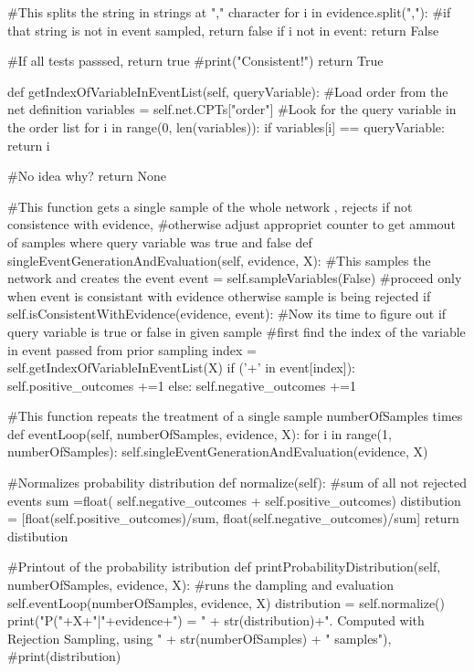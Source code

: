 \documentclass[10pt]{article}
\begin{document}
\begin{spverbatim}
        #This splits the string in strings at "," character
        for i in evidence.split(","):
            #if that string is not in event sampled, return false
            if i not in event:
                return False
                
        #If all tests passsed, return true
	#print("Consistent!")
        return True
    
    def getIndexOfVariableInEventList(self,  queryVariable):
        #Load order from the net definition
        variables = self.net.CPTs["order"]
        #Look for the query variable in the order list
        for i in range(0,  len(variables)):
            if variables[i] == queryVariable:
                return i 
        
        #No idea why?
        return None
                
    
    #This function gets a single sample of the whole network , rejects if not consistence with evidence, 
    #otherwise adjust appropriet counter to get ammout of samples where query variable was true and false
    def singleEventGenerationAndEvaluation(self, evidence,  X):
        #This samples the network  and creates the event
        event = self.sampleVariables(False)
        #proceed only when event is consistant with evidence otherwise sample is being rejected
        if self.isConsistentWithEvidence(evidence,  event):
            #Now its time to figure out if query variable is true or false in given sample
            #first find the index of the variable in event passed from prior sampling
            index = self.getIndexOfVariableInEventList(X)
            if ('+' in event[index]):
                self.positive_outcomes +=1
            else:
                self.negative_outcomes +=1
           
    #This function repeats the treatment of a single sample numberOfSamples times
    def eventLoop(self,  numberOfSamples, evidence,  X):
        for i in range(1,  numberOfSamples):
            self.singleEventGenerationAndEvaluation(evidence,  X)
    
    #Normalizes probability distribution
    def normalize(self):
        #sum of all not rejected events
        sum =float( self.negative_outcomes + self.positive_outcomes)
        distibution = [float(self.positive_outcomes)/sum, float(self.negative_outcomes)/sum]
        return distibution
        
    #Printout of the probability istribution
    def printProbabilityDistribution(self, numberOfSamples,  evidence,  X):
        #runs the dampling and evaluation
        self.eventLoop(numberOfSamples,  evidence,  X)
        distribution = self.normalize()
        print("P("+X+"|"+evidence+") = " + str(distribution)+". Computed with Rejection Sampling, using " + str(numberOfSamples) + " samples"), 
        #print(distribution)
        


\end{spverbatim}
\end{document}
